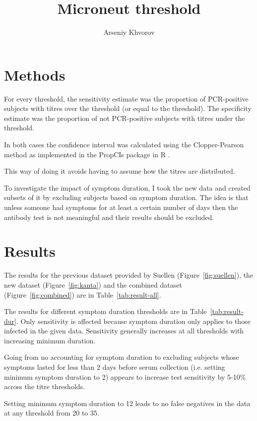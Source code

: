 \documentclass[11pt]{article}
\title{Microneut threshold}
\author{Arseniy Khvorov}
\begin{document}
\maketitle

\section{Methods}

For every threshold,
the sensitivity estimate
was the proportion of PCR-positive subjects with titres
over the threshold (or equal to the threshold).
The specificity estimate
was the proportion of not PCR-positive subjects
with titres under the threshold.

In both cases the confidence interval was calculated using the Clopper-Pearson
method as implemented in the PropCIs package \cite{PropCIs} in R \cite{R}.

This way of doing it avoids having to assume how the titres are distributed.

To investigate the impact of symptom duration, I took the new data and
created subsets of it by excluding subjects based on symptom duration.
The idea is that
unless someone had symptoms for at least a certain number of days then
the antibody test is not meaningful and their results should be excluded.

\section{Results}

The results for the previous dataset provided by Suellen
(Figure~\ref{fig:suellen}), the new dataset (Figure~\ref{fig:kanta}) and
the combined dataset (Figure~\ref{fig:combined})
are in Table~\ref{tab:result-all}.

The results for different symptom duration thresholds are in
Table~\ref{tab:result-dur}. Only sensitivity
is affected because symptom duration only applies to those infected in
the given data. Sensitivity generally increases at all thresholds with
increasing minimum duration.

Going from no accounting for symptom duration to excluding subjects whose
symptoms lasted for less than 2 days before serum collection
(i.e. setting minimum symptom duration to 2) appears to
increase test sensitivity by 5-10\% across the titre thresholds.

Setting minimum symptom duration to 12 leads to no false negatives in the data
at any threshold from 20 to 35.
\end{document}
